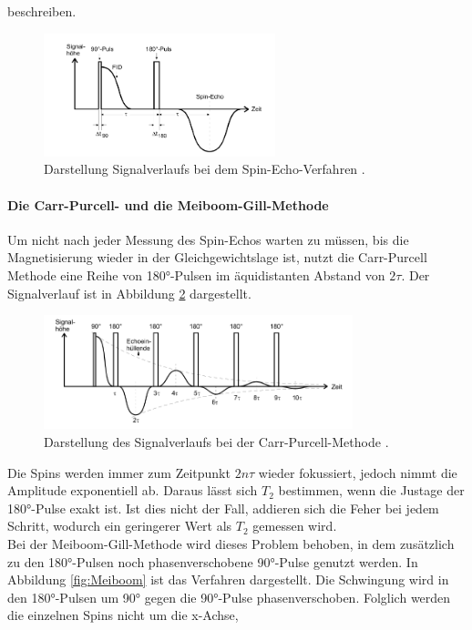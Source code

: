 beschreiben.
\begin{figure}[H]
  \centering
  \includegraphics[width=0.6\textwidth]{pics/Signalverlauf.png}
  \caption{Darstellung Signalverlaufs bei dem Spin-Echo-Verfahren \cite{Anleitung}.}
  \label{fig:Signal}
\end{figure}
\paragraph{Die Carr-Purcell- und die Meiboom-Gill-Methode}
Um nicht nach jeder Messung des Spin-Echos warten zu müssen, bis die Magnetisierung wieder
in der Gleichgewichtslage ist, nutzt die Carr-Purcell Methode eine Reihe von
180°-Pulsen im äquidistanten Abstand von $2\tau$. Der Signalverlauf ist in Abbildung
\ref{fig:CPM} dargestellt.
\begin{figure}[H]
  \centering
  \includegraphics[width=0.8\textwidth]{pics/CPM.png}
  \caption{Darstellung des Signalverlaufs bei der Carr-Purcell-Methode \cite{Anleitung}.}
  \label{fig:CPM}
\end{figure}
Die Spins werden immer zum Zeitpunkt $2n\tau$ wieder fokussiert,
jedoch nimmt die Amplitude exponentiell ab. Daraus lässt sich $T_2$ bestimmen, wenn
die Justage der 180°-Pulse exakt ist. Ist dies nicht der Fall, addieren sich die
Feher bei jedem Schritt, wodurch ein geringerer Wert als $T_2$ gemessen wird.\\
Bei der Meiboom-Gill-Methode wird dieses Problem behoben, in dem zusätzlich zu den 180°-Pulsen
noch phasenverschobene 90°-Pulse genutzt werden. In Abbildung \ref{fig:Meiboom}
ist das Verfahren dargestellt. Die Schwingung wird in den 180°-Pulsen
um 90° gegen die 90°-Pulse phasenverschoben.
Folglich werden die einzelnen Spins nicht um die x-Achse,
